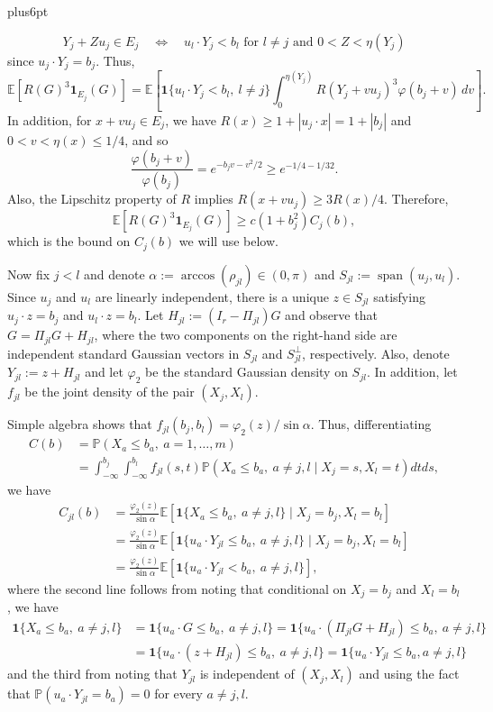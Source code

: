\documentclass[11pt,letterpaper,twoside,leqno]{article}
\makeatletter
\theoremstyle{bookplain}
\theoremstyle{bookremark}
\renewenvironment{proof}[1][\proofname]{\par
  \pushQED{\qed}\normalfont\topsep6pt plus6pt\relax
  \trivlist\item[\hskip\labelsep\bfseries #1\@addpunct{.}]\ignorespaces
}{\popQED\endtrivlist\@endpefalse}
\newcommand{\E}{\mathbb E}
\newcommand{\Pp}{\mathbb P}
\newcommand{\ind}{\mathbf 1}
\makeatother
\begin{document}
\begin{proof}
\[
Y_j + Zu_j \in E_j\quad\Longleftrightarrow\quad u_l\cdot Y_j < b_l\text{ for }{l\neq j}\text{ and }0<Z<\eta(Y_j)
\]
since $u_j\cdot Y_j = b_j$. Thus,
\[
\E[R(G)^3\ind_{E_j}(G)]
=\E\left[
\ind\{u_l\cdot Y_j<b_l,\ l\ne j\}
\int_0^{\eta(Y_j)}
R(Y_j+vu_j)^3\varphi(b_j+v)\,dv
\right].
\]
In addition, for $x+vu_j \in E_j$, we have $R(x) \geq 1+ |u_j\cdot x| = 1+ |b_j|$ and $0<v<\eta(x)\leq 1/4$, and so
\[
 \frac{\varphi(b_j+v)}{\varphi(b_j)}
 =e^{-b_jv-v^2/2}\ge e^{-1/4-1/32}.
\]
Also, the Lipschitz property of \(R\) implies
\(R(x+vu_j)\geq 3R(x)/4\). Therefore,
\begin{equation}
 \E[R(G)^3\ind_{E_j}(G)]
 \ge c(1+b_j^2)C_j(b),
 \label{appx-an:one-region}
\end{equation}
which is the bound on $C_j(b)$ we will use below.




Now fix \(j<l\) and denote
\(\alpha:=\arccos(\rho_{jl})\in(0,\pi)\) and
\(S_{jl}:=\operatorname{span}(u_j, u_l)\).
Since \(u_j\) and \(u_l\) are linearly independent,
there is a unique \(z\in S_{jl}\) satisfying
$u_j\cdot z=b_j$ and $u_l\cdot z=b_l$.
Let \(H_{jl}:=(I_r-\Pi_{jl})G\) and observe that \(G=\Pi_{jl}G+H_{jl}\), where the two components on the right-hand side are independent standard Gaussian vectors in \(S_{jl}\) and \(S_{jl}^\perp\), respectively. Also, denote \(Y_{jl}:=z+H_{jl}\) and let \(\varphi_2\) be the standard Gaussian density on \(S_{jl}\). In addition, let $f_{j l}$ be the joint density of the pair $(X_j,X_l)$.

Simple algebra shows that $f_{j l}(b_j, b_l) = \varphi_2(z)/\sin\alpha$. Thus, differentiating
\begin{align*}
C(b) & = \Pp(X_a\leq b_a, \ a=1,\dots,m) \\
&= \int_{-\infty}^{b_j}\int_{-\infty}^{b_l}f_{jl}(s,t)\Pp(X_a\leq b_a, \ a\neq j,l\mid X_j = s,X_l = t)dt ds,
\end{align*}
we have
\begin{align}
C_{jl}(b) & = \frac{\varphi_2(z)}{\sin\alpha}\E[\ind\{X_a \leq b_a, \ a\neq j,l\} \mid X_j = b_j, X_l = b_l] \nonumber\\
& = \frac{\varphi_2(z)}{\sin\alpha}
\E[\ind\{u_a\cdot Y_{jl}\leq b_a,\ a\ne j,l\}\mid X_j=b_j,X_l=b_l] \nonumber \\
& = \frac{\varphi_2(z)}{\sin\alpha}
\E[\ind\{u_a\cdot Y_{jl} <  b_a,\ a\ne j,l\}],\label{appx-an:two-density}
\end{align}
where the second line follows from noting that conditional on $X_j=b_j$ and $X_l = b_l$, we have 
\begin{align*}
\ind\{X_a\leq b_a, \ a\neq j,l\} 
&= \ind\{u_a\cdot G\leq b_a, \ a\neq j,l\} = \ind\{ u_a\cdot(\Pi_{jl} G + H_{jl}) \leq b_a,\ a\neq j,l \} \\
& = \ind\{u_a\cdot (z + H_{jl})\leq b_a, \ a\neq j,l\} = \ind\{u_a\cdot Y_{jl}\leq b_a, a\neq j,l\}
\end{align*}
and the third from noting that $Y_{jl}$ is independent of $(X_j,X_l)$ and using the fact that
\(\Pp(u_a\cdot Y_{jl}=b_a)=0\) for every \(a\ne j,l\).


\end{proof}
\end{document}
